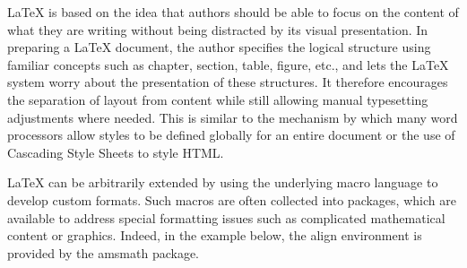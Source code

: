 LaTeX is based on the idea that authors should be able to focus on the content of what they are writing without being distracted by its visual presentation. In preparing a LaTeX document, the author specifies the logical structure using familiar concepts such as chapter, section, table, figure, etc., and lets the LaTeX system worry about the presentation of these structures. It therefore encourages the separation of layout from content while still allowing manual typesetting adjustments where needed. This is similar to the mechanism by which many word processors allow styles to be defined globally for an entire document or the use of Cascading Style Sheets to style HTML.

LaTeX can be arbitrarily extended by using the underlying macro language to develop custom formats. Such macros are often collected into packages, which are available to address special formatting issues such as complicated mathematical content or graphics. Indeed, in the example below, the align environment is provided by the amsmath package.